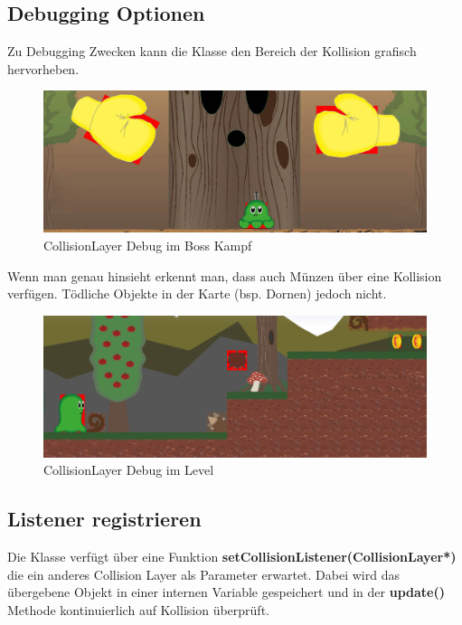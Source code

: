 \subsection{Debugging Optionen}\label{sec:CollisionLayerDebug}

Zu Debugging Zwecken kann die  Klasse den Bereich der Kollision grafisch hervorheben.

\begin{figure}[H]
  \centering
  \includegraphics[width=14cm]{resources/CollisionLayer_BossKampf.jpg}
  \caption{CollisionLayer Debug im Boss Kampf}
  \label{fig:collision_debug_boss} 
\end{figure}

Wenn man genau hinsieht erkennt man, dass auch Münzen über eine Kollision verfügen. Tödliche Objekte in der Karte (bsp. Dornen) jedoch nicht.

\begin{figure}[H]
  \centering
  \includegraphics[width=\textwidth - 50pt]{resources/CollisionLayer_Level}
  \caption{CollisionLayer Debug im Level}
  \label{fig:collision_debug_level} 
\end{figure}


\subsection{Listener registrieren}

Die Klasse verfügt über eine Funktion \textbf{setCollisionListener(CollisionLayer*)} die ein anderes Collision Layer als Parameter erwartet. Dabei wird das übergebene Objekt in einer internen Variable gespeichert und in der \textbf{update()} Methode kontinuierlich auf Kollision überprüft.

